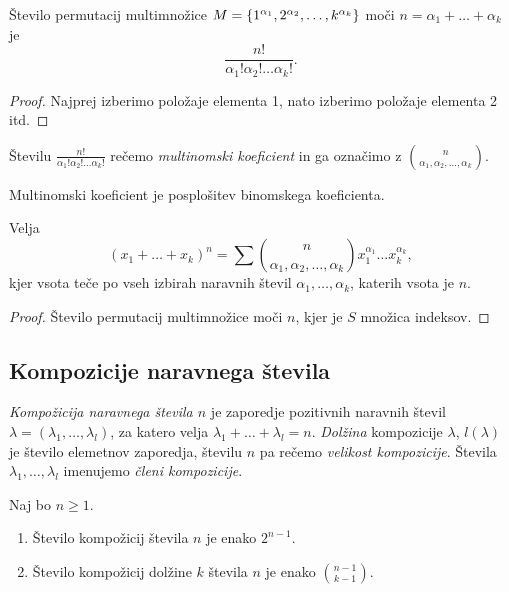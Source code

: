 \begin{trditev}
    Število permutacij multimnožice $M=\left\{1^{\alpha_1}, 2^{\alpha_2}, \ldots, k^{\alpha_k}\right\}$ moči $n = \alpha_1 + \ldots + \alpha_k$ je 
    $$\frac{n!}{\alpha_1!\alpha_2!\ldots\alpha_k!}.$$
\end{trditev}

\begin{proof}
    Najprej izberimo položaje elementa 1, nato izberimo položaje elementa 2 itd.
\end{proof}

\begin{definicija}
    Številu $\frac{n!}{\alpha_1! \alpha_2! \ldots \alpha_k!}$ rečemo \emph{multinomski koeficient} in ga označimo z $\binom{n}{\alpha_1, \alpha_2, \ldots, \alpha_k}$.
\end{definicija}

\begin{opomba}
    Multinomski koeficient je posplošitev binomskega koeficienta.
\end{opomba}

\begin{trditev}
    Velja 
    $$(x_1 + \ldots + x_k)^n = \sum \binom{n}{\alpha_1, \alpha_2, \ldots, \alpha_k}x_1^{\alpha_1} \ldots x_k^{\alpha_k},$$
    kjer vsota teče po vseh izbirah naravnih števil $\alpha_1, \ldots, \alpha_k$, katerih vsota je $n$.
\end{trditev}

\begin{proof}
    Število permutacij multimnožice moči $n$, kjer je $S$ množica indeksov.
\end{proof}

\subsection{Kompozicije naravnega števila}
\begin{definicija}
    \emph{Kompožicija naravnega števila $n$} je zaporedje pozitivnih naravnih števil $\lambda = (\lambda_1, \ldots, \lambda_l)$, za katero velja $\lambda_1 + \ldots + \lambda_l = n$. \emph{Dolžina} kompozicije $\lambda$, $l(\lambda)$ je število elemetnov zaporedja, številu $n$ pa rečemo \emph{velikost kompozicije}. Števila $\lambda_1, \ldots, \lambda_l$ imenujemo \emph{členi kompozicije}.
\end{definicija}

\begin{trditev}
    Naj bo $n \geq 1$.
    \begin{enumerate}
        \item Število kompožicij števila $n$ je enako $2^{n-1}$.
        \item Število kompožicij dolžine $k$ števila $n$ je enako $\binom{n-1}{k-1}$.
    \end{enumerate}
\end{trditev}

